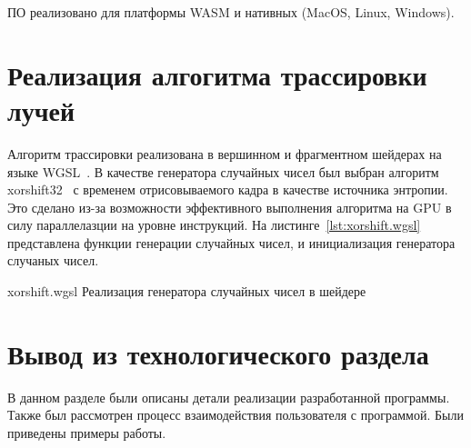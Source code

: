 ПО реализовано для платформы WASM и нативных (MacOS, Linux, Windows).

\section{Реализация алгогитма трассировки лучей}

Алгоритм трассировки реализована в 
вершинном и фрагментном шейдерах на языке WGSL~\cite{WebGPUSL}.
В качестве генератора случайных чисел был выбран алгоритм xorshift32~\cite{xorshift}
с временем отрисовываемого кадра в качестве источника энтропии. Это сделано
из-за возможности эффективного выполнения алгоритма на GPU в 
силу параллелазции на уровне инструкций. На листинге~\ref{lst:xorshift.wgsl} представлена 
функции генерации случайных чисел, и инициализация генератора случаных чисел.

    {xorshift.wgsl}
    {Реализация генератора случайных чисел в шейдере}

\section{Вывод из технологического раздела}

В данном разделе были описаны детали реализации разработанной программы. 
Также был рассмотрен процесс взаимодействия пользователя с программой.
Были приведены примеры работы.
